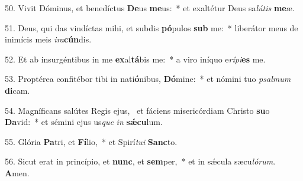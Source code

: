 50. Vivit Dóminus, et benedíctus \textbf{De}us \textbf{me}us:~*  et exaltétur Deus sa\textit{lú}\textit{tis} \textbf{me}æ.\

51. Deus, qui das vindíctas mihi, et subdis \textbf{pó}pulos \textbf{sub} me:~*  liberátor meus de inimícis meis \textit{i}\textit{ra}\textbf{cún}dis.\

52. Et ab insurgéntibus in me \textbf{ex}al\textbf{tá}bis me:~*  a viro iníquo e\textit{rí}\textit{pi}\textbf{es} me.\

53. Proptérea confitébor tibi in nati\textbf{ó}nibus, \textbf{Dó}mine:~*  et nómini tuo \textit{psal}\textit{mum} \textbf{di}cam.\

54. Magníficans salútes Regis ejus, \dag\  et fáciens misericórdiam Christo \textbf{su}o \textbf{Da}vid:~*  et sémini ejus us\textit{que} \textit{in} \textbf{sǽ}\textbf{cu}lum.\

55. Glória \textbf{Pa}tri, et \textbf{Fí}lio,~*  et Spirí\textit{tu}\textit{i} \textbf{Sanc}to.\

56. Sicut erat in princípio, et \textbf{nunc}, et \textbf{sem}per,~*  et in sǽcula sæcu\textit{ló}\textit{rum}. \textbf{A}men.\

